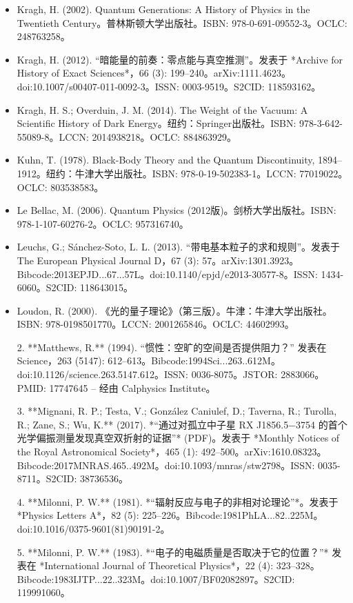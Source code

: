 \begin{itemize}
\item Kragh, H. (2002). Quantum Generations: A History of Physics in the Twentieth Century。普林斯顿大学出版社。ISBN: 978-0-691-09552-3。OCLC: 248763258。
\item Kragh, H. (2012). “暗能量的前奏：零点能与真空推测”。发表于 *Archive for History of Exact Sciences*，66 (3): 199–240。arXiv:1111.4623。doi:10.1007/s00407-011-0092-3。ISSN: 0003-9519。S2CID: 118593162。
\item Kragh, H. S.; Overduin, J. M. (2014). The Weight of the Vacuum: A Scientific History of Dark Energy。纽约：Springer出版社。ISBN: 978-3-642-55089-8。LCCN: 2014938218。OCLC: 884863929。
\item Kuhn, T. (1978). Black-Body Theory and the Quantum Discontinuity, 1894–1912。纽约：牛津大学出版社。ISBN: 978-0-19-502383-1。LCCN: 77019022。OCLC: 803538583。
\item Le Bellac, M. (2006). Quantum Physics (2012版)。剑桥大学出版社。ISBN: 978-1-107-60276-2。OCLC: 957316740。
\item Leuchs, G.; Sánchez-Soto, L. L. (2013). “带电基本粒子的求和规则”。发表于 The European Physical Journal D，67 (3): 57。arXiv:1301.3923。Bibcode:2013EPJD...67...57L。doi:10.1140/epjd/e2013-30577-8。ISSN: 1434-6060。S2CID: 118643015。


\item Loudon, R. (2000). 《光的量子理论》（第三版）。牛津：牛津大学出版社。ISBN: 978-0198501770。LCCN: 2001265846。OCLC: 44602993。

2. **Matthews, R.** (1994). “惯性：空旷的空间是否提供阻力？” 发表在 Science，263 (5147): 612–613。Bibcode:1994Sci...263..612M。doi:10.1126/science.263.5147.612。ISSN: 0036-8075。JSTOR: 2883066。PMID: 17747645 – 经由 Calphysics Institute。

3. **Mignani, R. P.; Testa, V.; González Caniulef, D.; Taverna, R.; Turolla, R.; Zane, S.; Wu, K.** (2017). *“通过对孤立中子星 RX J1856.5−3754 的首个光学偏振测量发现真空双折射的证据”* (PDF)。发表于 *Monthly Notices of the Royal Astronomical Society*，465 (1): 492–500。arXiv:1610.08323。Bibcode:2017MNRAS.465..492M。doi:10.1093/mnras/stw2798。ISSN: 0035-8711。S2CID: 38736536。

4. **Milonni, P. W.** (1981). *“辐射反应与电子的非相对论理论”*。发表于 *Physics Letters A*，82 (5): 225–226。Bibcode:1981PhLA...82..225M。doi:10.1016/0375-9601(81)90191-2。

5. **Milonni, P. W.** (1983). *“电子的电磁质量是否取决于它的位置？”* 发表在 *International Journal of Theoretical Physics*，22 (4): 323–328。Bibcode:1983IJTP...22..323M。doi:10.1007/BF02082897。S2CID: 119991060。


\end{itemize}
